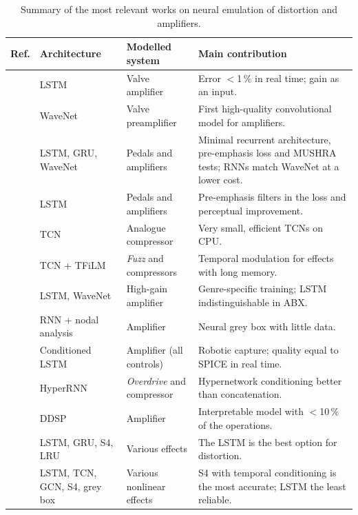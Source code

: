 \documentclass[ENG]{TFUOC}%
\begin{document}
\begin{table}[H]
\centering
\caption{Summary of the most relevant works on neural emulation of distortion and amplifiers.}
\label{tab:estat}
\scriptsize
\begin{tabularx}{\textwidth}{>{\raggedright\arraybackslash\hsize=0.4\hsize}X>{\raggedright\arraybackslash\hsize=0.95\hsize}X>{\raggedright\arraybackslash\hsize=0.95\hsize}X>{\raggedright\arraybackslash\hsize=1.7\hsize}X}
\toprule
\textbf{Ref.} & \textbf{Architecture} & \textbf{Modelled system} & \textbf{Main contribution} \\
\midrule
\cite{schmitz2018} & LSTM & Valve amplifier & Error $<$1\,\% in real time; gain as an input. \\
\cite{damskagg2019} & WaveNet & Valve preamplifier & First high-quality convolutional model for amplifiers. \\
\cite{wright2019,wright2020} & LSTM, GRU, WaveNet & Pedals and amplifiers & Minimal recurrent architecture, pre-emphasis loss and MUSHRA tests; RNNs match WaveNet at a lower cost. \\
\cite{wright2020percep} & LSTM & Pedals and amplifiers & Pre-emphasis filters in the loss and perceptual improvement. \\
\cite{steinmetz2022} & TCN & Analogue compressor & Very small, efficient TCNs on CPU. \\
\cite{comunita2023} & TCN + TFiLM & \emph{Fuzz} and compressors & Temporal modulation for effects with long memory. \\
\cite{cassidy2023} & LSTM, WaveNet & High-gain amplifier & Genre-specific training; LSTM indistinguishable in ABX. \\
\cite{miklanek2023} & RNN + nodal analysis & Amplifier & Neural grey box with little data. \\
\cite{juvela2023} & Conditioned LSTM & Amplifier (all controls) & Robotic capture; quality equal to SPICE in real time. \\
\cite{yeh2024hyper} & HyperRNN & \emph{Overdrive} and compressor & Hypernetwork conditioning better than concatenation. \\
\cite{yeh2024ddsp} & DDSP & Amplifier & Interpretable model with $<$10\,\% of the operations. \\
\cite{simionato2025} & LSTM, GRU, S4, LRU & Various effects & The LSTM is the best option for distortion. \\
\cite{comunita2025} & LSTM, TCN, GCN, S4, grey box & Various nonlinear effects & S4 with temporal conditioning is the most accurate; LSTM the least reliable. \\
\bottomrule
\end{tabularx}
\end{table}
\end{document}
